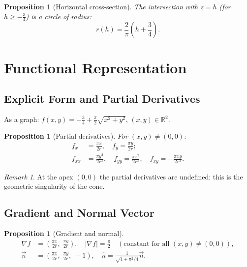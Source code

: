 \documentclass[12pt,a4paper]{article}
\theoremstyle{plain}
\newtheorem{proposition}[theorem]{Proposition}
\theoremstyle{definition}
\theoremstyle{remark}
\newtheorem{remark}{Remark}[section]
\newcommand{\R}{\mathbb{R}}
\newcommand{\vek}[1]{\vec{#1}}
\begin{document}
\begin{proposition}[Horizontal cross-section]\label{prop:horizontal}
The intersection with $z=h$ (for $h\geq -\tfrac{3}{4}$) is a circle of radius:
\begin{equation}\label{eq:radius_h}
r(h) = \frac{2}{\pi}\!\left(h+\frac{3}{4}\right).
\end{equation}
\end{proposition}

\section{Functional Representation}

\subsection{Explicit Form and Partial Derivatives}

As a graph: $f(x,y) = -\tfrac{3}{4}+\tfrac{\pi}{2}\sqrt{x^2+y^2}$, $(x,y)\in\R^2$.

\begin{proposition}[Partial derivatives]\label{prop:partial}
For $(x,y)\neq(0,0)$:
\begin{align}
f_x &= \frac{\pi x}{2r},\quad f_y = \frac{\pi y}{2r};\label{eq:grad1}\\
f_{xx} &= \frac{\pi y^2}{2r^3},\quad f_{yy} = \frac{\pi x^2}{2r^3},\quad
f_{xy} = -\frac{\pi xy}{2r^3}.\label{eq:grad2}
\end{align}
\end{proposition}

\begin{remark}
At the apex $(0,0)$ the partial derivatives are undefined: this is the geometric
singularity of the cone.
\end{remark}

\subsection{Gradient and Normal Vector}

\begin{proposition}[Gradient and normal]\label{prop:gradient}
\begin{align*}
\nabla f &= \left(\frac{\pi x}{2r},\;\frac{\pi y}{2r}\right),\quad
|\nabla f| = \frac{\pi}{2}\quad(\text{constant for all }(x,y)\neq(0,0)),\\
\vek{n} &= \left(\frac{\pi x}{2r},\;\frac{\pi y}{2r},\;-1\right),\quad
\hat{n} = \frac{1}{\sqrt{1+\pi^2/4}}\vek{n}.
\end{align*}
\end{proposition}
\end{document}
